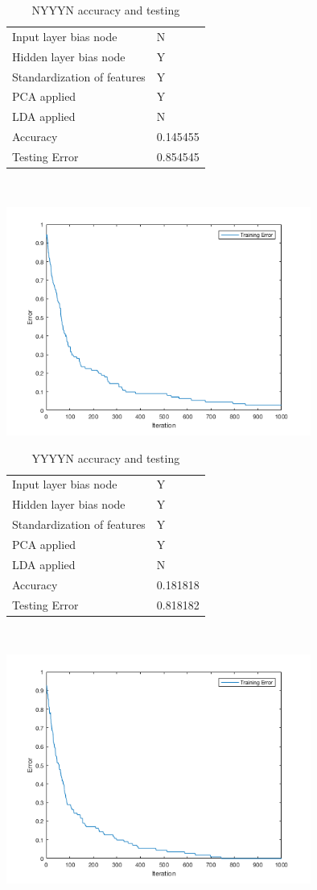 \documentclass[12pt]{article}
\newcommand{\accuracyAndTestErrorTable}[8]{
  \begin{tabular}{l|l}
    \hline
    Input layer bias node & #1 \\
    Hidden layer bias node & #2 \\
    Standardization of features & #3 \\
    PCA applied & #4 \\
    LDA applied & #5 \\
    \hline
    Accuracy & #6 \\
    Testing Error & #7 \\
    \hline
  \end{tabular}
  ~\\[60pt]
  \caption{#8}
}
\begin{document}


\begin{center}
  \begin{table}[H]
    \begin{varwidth}[b]{0.4\linewidth}
      \centering
      \accuracyAndTestErrorTable{N}{Y}{Y}{Y}{N}{0.145455}{0.854545}{NYYYN accuracy and testing}
      \label{table:NYYYN}
    \end{varwidth}%
    \hfill
    \begin{minipage}[b]{0.6\linewidth}
      \centering
      \includegraphics[width=100mm]{NYYYN_training_error.png}
      \label{fig:NYYYN}
    \end{minipage}
  \end{table}
\end{center}




\begin{center}
  \begin{table}[H]
    \begin{varwidth}[b]{0.4\linewidth}
      \centering
      \accuracyAndTestErrorTable{Y}{Y}{Y}{Y}{N}{0.181818}{0.818182}{YYYYN accuracy and testing}
      \label{table:YYYYN}
    \end{varwidth}%
    \hfill
    \begin{minipage}[b]{0.6\linewidth}
      \centering
      \includegraphics[width=100mm]{YYYYN_training_error.png}
      \label{fig:YYYYN}
    \end{minipage}
  \end{table}
\end{center}
\end{document}
